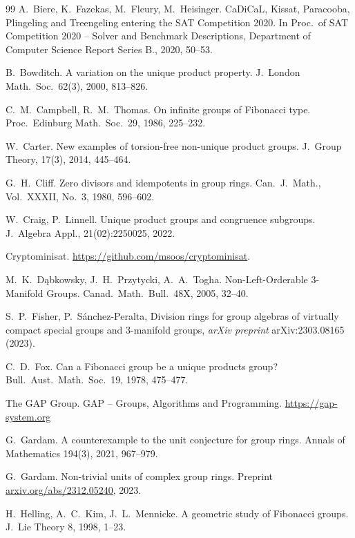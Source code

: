 \documentclass[11pt]{amsart}
\theoremstyle{mythm}
\theoremstyle{mydef}
\theoremstyle{myrem}
\numberwithin{equation}{section}
\begin{document}
 
{\small
\begin{thebibliography}{99}
A.\ Biere, K.\ Fazekas, M.\ Fleury, M.\ Heisinger.
CaDiCaL, Kissat, Paracooba, Plingeling and Treengeling entering the SAT Competition 2020.
In Proc.~of {SAT Competition} 2020 -- Solver and Benchmark Descriptions,
Department of Computer Science Report Series B., 2020, 50--53.

  B.\ Bowditch. A variation on the unique product property.
  J.\ London Math.\ Soc.\ 62(3), 2000, 813--826.


  C.\ M.\ Campbell, R.\ M.\ Thomas.
  On infinite groups of Fibonacci type.
Proc.\ Edinburg Math.\ Soc.\ 29, 1986, 225--232.


W.\ Carter. 
New examples of torsion-free non-unique product groups. 
J.\ Group Theory, 17(3), 2014, 445--464.

  G.\ H.\ Cliff.
  Zero divisors and idempotents in group rings.
Can.\ J.\ Math., Vol.\ XXXII, No.\ 3, 1980, 596--602.

W.\ Craig, P.\ Linnell. 
Unique product groups and congruence subgroups. 
J.\ Algebra Appl., 21(02):2250025, 2022.

Cryptominisat.   
\url{https://github.com/msoos/cryptominisat}.

  M.\ K.\ D\k{a}bkowsky, J.\ H.\ Przytycki, A.\ A.\ Togha.
  Non-Left-Orderable $3$-Manifold Groups.
Canad.\ Math.\ Bull.\ 48X, 2005, 32--40.

S.~P.~Fisher, P.~Sánchez-Peralta,
\newblock Division rings for group algebras of virtually compact special groups and $3$-manifold groups,
\newblock \emph{arXiv preprint} arXiv:2303.08165 (2023).



  C.\ D.\ Fox. Can a Fibonacci group be a unique products group?
  Bull.\ Aust.\ Math.\ Soc.\ 19, 1978, 475--477.

The GAP Group. 
GAP -- Groups, Algorithms and Programming. \url{https://gap-system.org} 
 
G.\ Gardam.
A counterexample to the unit conjecture for group rings.
Annals of Mathematics 194(3), 2021, 967--979. 

G.\ Gardam.
Non-trivial units of complex group rings.
  Preprint \url{arxiv.org/abs/2312.05240}, 2023.
  
H.\ Helling, A.\ C.\  Kim, J.\ L.\  Mennicke.
A geometric study of Fibonacci groups. 
J.\ Lie Theory 8, 1998,  1--23.



\end{thebibliography}}
\end{document}
